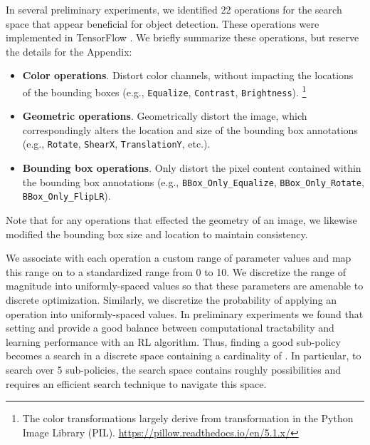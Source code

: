 \documentclass[10pt,twocolumn,letterpaper]{article}
\newcommand{\cmd}[1]{{\tt #1}}
\begin{document}
In several preliminary experiments, we identified 22 operations for the search space that appear beneficial for object detection. These operations were implemented in TensorFlow \cite{tensorflow-osdi2016}. We briefly summarize these operations, but reserve the details for the Appendix: \begin{itemize}
    \item \textbf{Color operations}. Distort color channels, without impacting the locations of the bounding boxes (e.g., \cmd{Equalize}, \cmd{Contrast}, \cmd{Brightness}). \footnote{The color transformations largely derive from transformation in the Python Image Library (PIL). \url{https://pillow.readthedocs.io/en/5.1.x/}} 
    
    \item \textbf{Geometric operations}. Geometrically distort the image, which correspondingly alters the location and size of the bounding box annotations (e.g., \cmd{Rotate}, \cmd{ShearX}, \cmd{TranslationY}, etc.).
    
    \item \textbf{Bounding box operations}. Only distort the pixel content contained within the bounding box annotations (e.g., \cmd{BBox\_Only\_Equalize}, \cmd{BBox\_Only\_Rotate}, \cmd{BBox\_Only\_FlipLR}).  
\end{itemize}

Note that for any operations that effected the geometry of an image, we likewise modified the bounding box size and location to maintain consistency.

We associate with each operation a custom range of parameter values and map this range on to a standardized range from 0 to 10.
We discretize the range of magnitude into  uniformly-spaced values so that these parameters are amenable to discrete optimization. Similarly, we discretize the probability of applying an operation into  uniformly-spaced values. 
In preliminary experiments we found that setting  and  provide a good balance between computational tractability and learning performance with an RL algorithm.
Thus, finding a good sub-policy becomes a search in a discrete space containing a cardinality of .
In particular, to search over 5 sub-policies, the search space contains roughly  possibilities and requires an efficient search technique to navigate this space.
\end{document}
